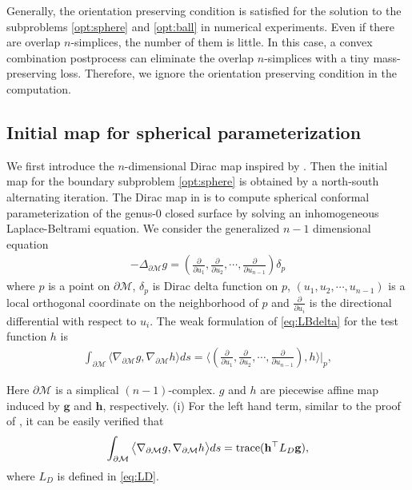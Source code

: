 \documentclass{article}
\begin{document}
\begin{remark}
    Generally, the orientation preserving condition is satisfied for the solution to the subproblems \eqref{opt:sphere} and \eqref{opt:ball} in numerical experiments. Even if there are overlap $n$-simplices, the number of them is little. In this case, a convex combination postprocess can eliminate the overlap $n$-simplices with a tiny mass-preserving loss. Therefore, we ignore the orientation preserving condition in the computation.
\end{remark}




\subsection{Initial map for spherical parameterization}

We first introduce the $n$-dimensional Dirac map inspired by \cite{SHSA00}. Then the initial map for the boundary subproblem \eqref{opt:sphere} is obtained by a north-south alternating iteration. The Dirac map in \cite{SHSA00} is to compute spherical conformal parameterization of the genus-$0$ closed surface by solving an inhomogeneous Laplace-Beltrami equation. We consider the generalized $n-1$ dimensional equation
\begin{align} \label{eq:LBdelta}
    -\Delta_{\partial \mathcal{M}} g = \left(\frac{\partial}{\partial u_1},\frac{\partial}{\partial u_2},\cdots,\frac{\partial}{\partial u_{n-1}}\right) \delta_p
\end{align}
where $p$ is a point on $\partial \mathcal{M}$, $\delta_p$ is Dirac delta function on $p$, $(u_1,u_2,\cdots,u_{n-1})$ is a local orthogonal coordinate on the neighborhood of $p$ and $\frac{\partial}{\partial u_i}$ is the directional differential with respect to $u_i$. The weak formulation of \eqref{eq:LBdelta} for the test function $h$ is
    \begin{align} \label{eq:LBweak}
    \int_{\partial \mathcal{M}}\big\langle\nabla_{\partial \mathcal{M}} g,\nabla_{\partial \mathcal{M}} h\big\rangle ds
    = \Big\langle \left(\frac{\partial}{\partial u_1},\frac{\partial}{\partial u_2},\cdots,\frac{\partial}{\partial u_{n-1}}\right),h \Big\rangle\Big|_p,
\end{align}

Here $\partial \mathcal{M}$ is a simplical $(n-1)$-complex. $g$ and $h$ are piecewise affine map induced by $\mathbf{g}$ and $\mathbf{h}$, respectively. (i) For the left hand term, similar to the proof of , it can be easily verified that
\begin{align} \label{eq:LBweakleft}
    \int_{\partial \mathcal{M}}\big\langle\nabla_{\partial \mathcal{M}} g,\nabla_{\partial \mathcal{M}} h\big\rangle ds = \mathrm{trace}(\mathbf{h}^\top L_D \mathbf{g}),
\end{align}
where $L_D$ is defined in \eqref{eq:LD}.
\end{document}

